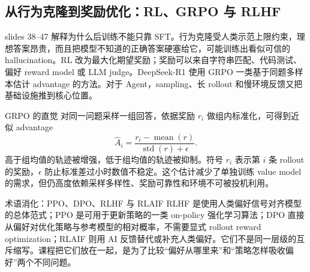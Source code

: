 \subsection{从行为克隆到奖励优化：RL、GRPO 与 RLHF}

slides 38--47 解释为什么后训练不能只靠 SFT。行为克隆受人类示范上限约束，理想答案昂贵，而且把模型不知道的正确答案硬塞给它，可能训练出看似可信的 hallucination。RL 改为最大化期望奖励；奖励可以来自字符串匹配、代码测试、偏好 reward model 或 LLM judge。DeepSeek-R1 使用 GRPO 一类基于同题多样本估计 advantage 的方法。对于 Agent，sampling、长 rollout 和慢环境反馈又把基础设施推到核心位置。


\begin{importantbox}{GRPO 的直觉}
对同一问题采样一组回答，依据奖励 $r_i$ 做组内标准化，可得到近似 advantage
\[
\hat A_i=\frac{r_i-\operatorname{mean}(r)}{\operatorname{std}(r)+\epsilon}.
\]
高于组均值的轨迹被增强，低于组均值的轨迹被抑制。符号 $r_i$ 表示第 $i$ 条 rollout 的奖励，$\epsilon$ 防止标准差过小时数值不稳定。这个估计减少了单独训练 value model 的需求，但仍高度依赖采样多样性、奖励可靠性和环境不可被投机利用。
\end{importantbox}

\begin{knowledgebox}{术语消化：PPO、DPO、RLHF 与 RLAIF}
RLHF 是使用人类偏好信号对齐模型的总体范式；PPO 是可用于更新策略的一类 on-policy 强化学习算法；DPO 直接从偏好对优化策略与参考模型的相对概率，不需要显式 rollout reward optimization；RLAIF 则用 AI 反馈替代或补充人类偏好。它们不是同一层级的互斥缩写。课程把它们放在一起，是为了比较“偏好从哪里来”和“策略怎样吸收偏好”两个不同问题。
\end{knowledgebox}

